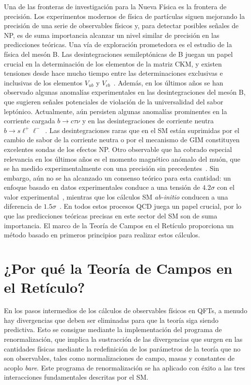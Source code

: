 Una de las fronteras de investigación para la Nueva Física es la frontera de precisión. Los experimentos modernos de física de partículas siguen mejorando la precisión de una serie de observables físicos y, para detectar posibles señales de NP, es de suma importancia alcanzar un nivel similar de precisión en las predicciones teóricas. Una vía de exploración prometedora es el estudio de la física del mesón B. Las desintegraciones semileptónicas de B juegan un papel crucial en la determinación de los elementos de la matriz CKM, y existen tensiones desde hace mucho tiempo entre las determinaciones exclusivas e inclusivas de los elementos $V_{ub}$ y $V_{cb}$~\citep{Ricciardi:2019zph}. Además, en los últimos años se han observado algunas anomalías experimentales en las desintegraciones del mesón B, que sugieren señales potenciales de violación de la universalidad del sabor leptónico. Actualmente, aún persisten algunas anomalías prominentes en la corriente cargada $b\to c\tau\nu$ y en las desintegraciones de corriente neutra $b\to s\ell^+\ell^-$~\citep{Capdevila:2023yhq}. Las desintegraciones raras que en el SM están suprimidas por el cambio de sabor de la corriente neutra o por el mecanismo de GIM constituyen excelentes sondas de los efectos NP. Otro observable que ha cobrado especial relevancia en los últimos años es el momento magnético anómalo del muón, que se ha medido experimentalmente con una precisión sin precedentes~\citep{Muong-2:2006rrc,PhysRevLett.131.161802}. Sin embargo, aún no se ha alcanzado un consenso teórico para esta cantidad: un enfoque basado en datos experimentales conduce a una tensión de $4.2\sigma$ con el valor experimental~\citep{Aoyama:2020ynm}, mientras que los cálculos SM \textit{ab-initio} conducen a una diferencia de $1.5\sigma$~\citep{Borsanyi:2020mff,Kuberski:2024bcj}. En todos estos procesos QCD juega un papel crucial, por lo que las predicciones teóricas precisas en este sector del SM son de suma importancia. El marco de la Teoría de Campos en el Retículo proporciona un método basado en primeros principios para realizar estos cálculos.

\section*{¿Por qué la Teoría de Campos en el Retículo?}

En los pasos intermedios de los cálculos de observables físicos en QFTs, a menudo hay divergencias que deben ser eliminadas para que la teoría siga siendo predictiva. Esto se consigue mediante la implementación del programa de renormalización, que implica la sustracción de las divergencias que surgen en las cantidades físicas mediante la redefinición de los parámetros de la teoría que no son observables, tales como normalizaciones de campo, masas y constantes de acoplo \textit{bare}. Este programa de renormalización se ha aplicado con éxito a las tres interacciones fundamentales descritas por el SM.

